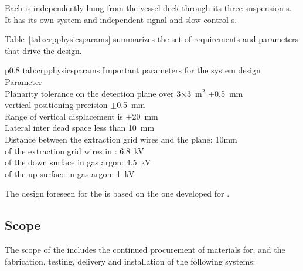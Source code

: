 Each  is independently hung from the vessel deck through its three
suspension \fdth{}s. It has its own  system and  independent signal and slow-control \fdth{}s.

Table~\ref{tab:crpphysicsparams} summarizes the set of requirements and parameters that drive the  design. 

\begin{dunetable}
{p{0.8\textwidth}}
{tab:crpphysicsparams}
{Important parameters for the  system design}   
Parameter \\ \toprowrule
 Planarity tolerance on the detection plane over \num{3}$\times$\SI{3}{m$^{2}$}  $\pm$\SI{0.5}{mm} \\ \colhline
  vertical positioning precision  $\pm$\SI{0.5}{mm} \\ \colhline
 Range of vertical displacement is $\pm$\SI{20}{mm}\\ \colhline
 Lateral inter  dead space  less than \SI{10}{mm} \\\colhline
 Distance between the extraction grid wires and the  plane: 10mm\\ \colhline 
  of the extraction grid wires in \lar:  \SI{6.8}{kV} \\ \colhline
  of the  down surface in gas argon:  \SI{4.5}{kV}\\ \colhline
  of the  up surface in gas argon: \SI{1}{kV}\\ \colhline
\end{dunetable}

The  design foreseen for the  is based on the one developed for .

\subsection{Scope}
\label{sec:fddp-crp-scope}

The scope of the  includes the continued procurement of materials for, and the fabrication, testing, delivery and installation of the following systems: 

